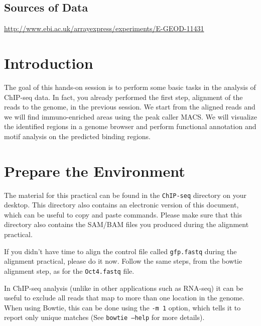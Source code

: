 \subsection{Sources of Data}
  \url{http://www.ebi.ac.uk/arrayexpress/experiments/E-GEOD-11431}


\newpage

\section{Introduction}

\begin{information}
The goal of this hands-on session is to perform some basic tasks in the analysis
of ChIP-seq data. In fact, you already performed the first step, alignment of
the reads to the genome, in the previous session. We start from the aligned
reads and we will find immuno-enriched areas using the peak caller MACS. We will
visualize the identified regions in a genome browser and perform functional
annotation and motif analysis on the predicted binding regions.
\end{information}

\section{Prepare the Environment}

\begin{information}
The material for this practical can be found in the \texttt{ChIP-seq} directory on your
desktop. This directory also contains an electronic version of this document,
which can be useful to copy and paste commands. Please make sure that this
directory also contains the SAM/BAM files you produced during the alignment
practical.
\end{information}

\begin{steps}
If you didn't have time to align the control file called \texttt{gfp.fastq}
during the alignment practical, please do it now. Follow the same steps, from
the bowtie alignment step, as for the \texttt{Oct4.fastq} file.
\end{steps}

\begin{note}
In ChIP-seq analysis (unlike in other applications such as RNA-seq) it can be useful
to exclude all reads that map to more than one location in the
genome. When using Bowtie, this can be done using the
\texttt{-m 1} option, which tells it to report only unique matches (See
\texttt{bowtie --help} for more details).
\end{note}


